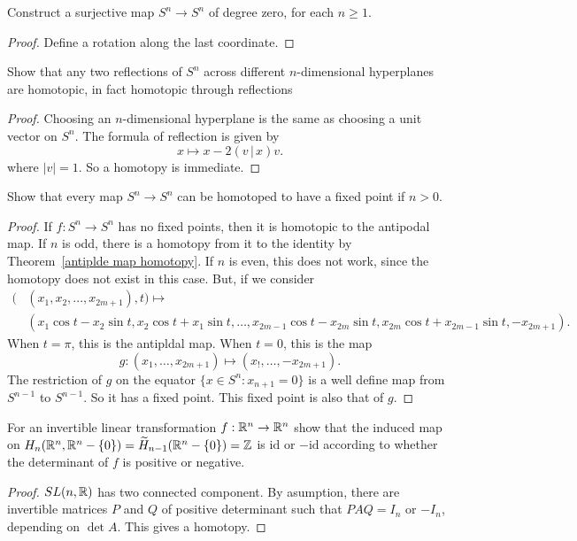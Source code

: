 \begin{exercise}
Construct a surjective map $S^n\to S^n$ of degree zero, for each $n\geq 1$.
\end{exercise}
\begin{proof}
Define a rotation along the last coordinate.
\end{proof}
\begin{exercise}
Show that any two reflections of $S^n$ across different $n$-dimensional hyperplanes are homotopic, in fact homotopic through reflections
\end{exercise}
\begin{proof}
Choosing an $n$-dimensional hyperplane is the same as choosing a unit vector on $S^n$. The formula of reflection is given by
\[x\mapsto x-2(v\,|\,x)v.\]
where $|v|=1$. So a homotopy is immediate.
\end{proof}
\begin{exercise}
Show that every map $S^n\to S^n$ can be homotoped to have a fixed point if $n>0$.
\end{exercise}
\begin{proof}
If $f:S^n\to S^n$ has no fixed points, then it is homotopic to the antipodal map. If $n$ is odd, there is a homotopy from it to the identity by Theorem~\ref{antiplde map homotopy}. If $n$ is even, this does not work, since the homotopy does not exist in this case. But, if we consider
\begin{align*}
\big(&(x_1,x_2,...,x_{2m+1}),t\big)\mapsto\\
&(x_1\cos t-x_2\sin t,x_2\cos t+x_1\sin t,\dots,x_{2m-1}\cos t-x_{2m}\sin t,x_{2m}\cos t+x_{2m-1}\sin t,-x_{2m+1}).
\end{align*}
When $t=\pi$, this is the antipldal map. When $t=0$, this is the map
\[g:(x_1,\dots,x_{2m+1})\mapsto(x_!,\dots,-x_{2m+1}).\]
The restriction of $g$ on the equator $\{x\in S^n:x_{n+1}=0\}$ is a well define map from $S^{n-1}$ to $S^{n-1}$. So it has a fixed point. This fixed point is also that of $g$.
\end{proof}
\begin{exercise}\label{matrix local homology}
For an invertible linear transformation $f:\mathbb{R}^n\to\mathbb{R}^n$ show that the induced map on $H_n(\mathbb{R}^n,\mathbb{R}^n-\{0\})=\widetilde{H}_{n-1}(\mathbb{R}^n-\{0\})=\mathbb{Z}$ is $\mathrm{id}$ or $-\mathrm{id}$ according to whether the determinant of $f$ is positive or negative.
\end{exercise}
\begin{proof}
$SL(n,\mathbb{R})$ has two connected component. By asumption, there are invertible matrices $P$ and $Q$ of positive determinant such that $PAQ=I_n$ or $-I_n$, depending on $\det A$. This gives a homotopy.
\end{proof}
